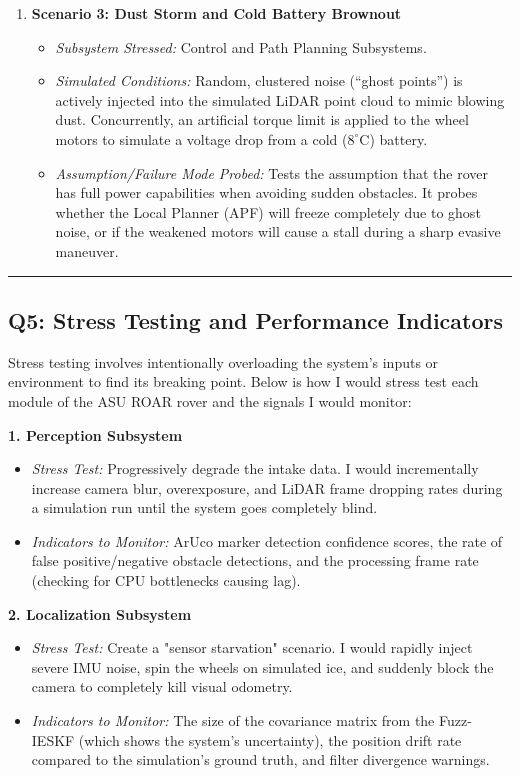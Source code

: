 \documentclass[12pt,a4paper]{article}
\begin{document}
\begin{enumerate}[leftmargin=*]
    \item \textbf{Scenario 3: Dust Storm and Cold Battery Brownout}
    \begin{itemize}
        \item \textit{Subsystem Stressed:} Control and Path Planning Subsystems.
        \item \textit{Simulated Conditions:} Random, clustered noise (``ghost points'') is actively injected into the simulated LiDAR point cloud to mimic blowing dust. Concurrently, an artificial torque limit is applied to the wheel motors to simulate a voltage drop from a cold ($8^\circ$C) battery.
        \item \textit{Assumption/Failure Mode Probed:} Tests the assumption that the rover has full power capabilities when avoiding sudden obstacles. It probes whether the Local Planner (APF) will freeze completely due to ghost noise, or if the weakened motors will cause a stall during a sharp evasive maneuver.
    \end{itemize}
\end{enumerate}

\vspace{0.3em}
\noindent\rule{\textwidth}{0.4pt}
\vspace{0.3em}


\subsection{Q5: Stress Testing and Performance Indicators}

Stress testing involves intentionally overloading the system's inputs or environment to find its breaking point. Below is how I would stress test each module of the ASU ROAR rover and the signals I would monitor:

\noindent\textbf{1. Perception Subsystem}
\begin{itemize}[leftmargin=*]
    \item \textit{Stress Test:} Progressively degrade the intake data. I would incrementally increase camera blur, overexposure, and LiDAR frame dropping rates during a simulation run until the system goes completely blind.
    \item \textit{Indicators to Monitor:} ArUco marker detection confidence scores, the rate of false positive/negative obstacle detections, and the processing frame rate (checking for CPU bottlenecks causing lag).
\end{itemize}

\noindent\textbf{2. Localization Subsystem}
\begin{itemize}[leftmargin=*]
    \item \textit{Stress Test:} Create a "sensor starvation" scenario. I would rapidly inject severe IMU noise, spin the wheels on simulated ice, and suddenly block the camera to completely kill visual odometry.
    \item \textit{Indicators to Monitor:} The size of the covariance matrix from the Fuzz-IESKF (which shows the system's uncertainty), the position drift rate compared to the simulation's ground truth, and filter divergence warnings.
\end{itemize}
\end{document}
